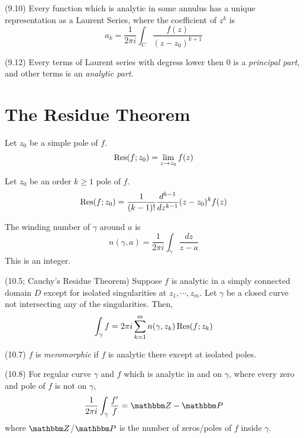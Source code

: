 \documentclass{article}
\begin{document}
\begin{theorem}(9.10)
  Every function which is analytic in some annulus
  has a unique representation as a Laurent Series,
  where the coefficient of \(z^k\) is
  \[a_k = \frac{1}{2\pi i} \int_C \frac{f(z)}{(z - z_0)^{k+1}}\]
\end{theorem}

\begin{definition}(9.12)
  Every terms of Laurent series with degress lower then \(0\)
  is a \emph{principal part},
  and other terms is an \emph{analytic part}.
\end{definition}

\section{The Residue Theorem}

\begin{theorem}
  Let \(z_0\) be a simple pole of \(f\).
  \[\operatorname{Res}(f; z_0) = \lim_{z \to z_0} f(z)\]

  Let \(z_0\) be an order \(k \ge 1\) pole of \(f\).
  \[\operatorname{Res}(f; z_0) = \frac{1}{(k-1)!} \frac{d^{k-1}}{dz^{k-1}} (z-z_0)^k f(z)\]
\end{theorem}

\begin{definition} The winding number of \(\gamma\) around \(a\) is
  \[n(\gamma, a) = \frac{1}{2\pi i} \int_\gamma \frac{dz}{z - a}\]
  This is an integer.
\end{definition}

\begin{theorem}(10.5; Cauchy's Residue Theorem)
  Suppose \(f\) is analytic in a simply connected domain \(D\)
  except for isolated singularities at \(z_1, \cdots, z_m\).
  Let \(\gamma\) be a closed curve not intersecting any of the singularities.
  Then,
  \[\int_\gamma f = 2\pi i \sum_{k=1}^m n(\gamma, z_k) \operatorname{Res}(f; z_k)\]
\end{theorem}

\begin{definition}(10.7)
  \(f\) is \emph{meromorphic} if \(f\) is analytic there except at isolated poles.
\end{definition}

\begin{theorem}(10.8)
  For regular curve \(\gamma\) and \(f\) which is analytic in and on \(\gamma\),
  where every zero and pole of \(f\) is not on \(\gamma\),
  \[\frac{1}{2\pi i}\int_\gamma\frac{f'}{f} = \bbZ - \bbP\]
  where \(\bbZ\)/\(\bbP\) is the number of zeros/poles of \(f\) inside \(\gamma\).
\end{theorem}
\end{document}
